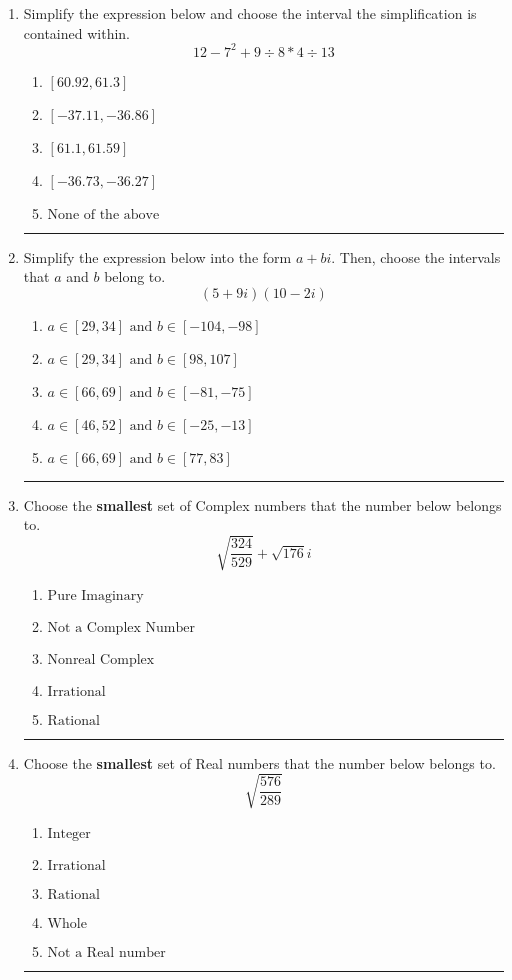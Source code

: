 \documentclass[14pt]{extbook}
\newcommand{\litem}[1]{\item#1\hspace*{-1cm}\rule{\textwidth}{0.4pt}}
\begin{document}
\begin{enumerate}
\litem{
Simplify the expression below and choose the interval the simplification is contained within.\[ 12 - 7^2 + 9 \div 8 * 4 \div 13 \]\begin{enumerate}[label=\Alph*.]
\item \( [60.92, 61.3] \)
\item \( [-37.11, -36.86] \)
\item \( [61.1, 61.59] \)
\item \( [-36.73, -36.27] \)
\item \( \text{None of the above} \)

\end{enumerate} }
\litem{
Simplify the expression below into the form $a+bi$. Then, choose the intervals that $a$ and $b$ belong to.\[ (5 + 9 i)(10 - 2 i) \]\begin{enumerate}[label=\Alph*.]
\item \( a \in [29, 34] \text{ and } b \in [-104, -98] \)
\item \( a \in [29, 34] \text{ and } b \in [98, 107] \)
\item \( a \in [66, 69] \text{ and } b \in [-81, -75] \)
\item \( a \in [46, 52] \text{ and } b \in [-25, -13] \)
\item \( a \in [66, 69] \text{ and } b \in [77, 83] \)

\end{enumerate} }
\litem{
Choose the \textbf{smallest} set of Complex numbers that the number below belongs to.\[ \sqrt{\frac{324}{529}}+\sqrt{176} i \]\begin{enumerate}[label=\Alph*.]
\item \( \text{Pure Imaginary} \)
\item \( \text{Not a Complex Number} \)
\item \( \text{Nonreal Complex} \)
\item \( \text{Irrational} \)
\item \( \text{Rational} \)

\end{enumerate} }
\litem{
Choose the \textbf{smallest} set of Real numbers that the number below belongs to.\[ \sqrt{\frac{576}{289}} \]\begin{enumerate}[label=\Alph*.]
\item \( \text{Integer} \)
\item \( \text{Irrational} \)
\item \( \text{Rational} \)
\item \( \text{Whole} \)
\item \( \text{Not a Real number} \)


\end{enumerate}}
\end{enumerate}
\end{document}

